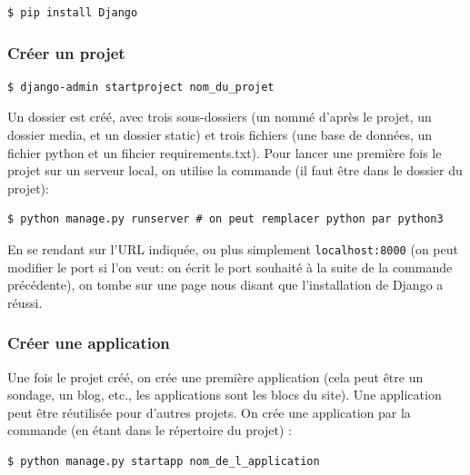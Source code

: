 \documentclass[a4paper, 10pt]{article}
\begin{document}
\begin{verbatim}
$ pip install Django
\end{verbatim}

\subsubsection{Créer un projet}
\begin{verbatim}
$ django-admin startproject nom_du_projet
\end{verbatim}

Un dossier est créé, avec trois sous-dossiers (un nommé d'après le projet, un dossier media, et un dossier static) et trois fichiers (une base de données, un fichier python et un fihcier requirements.txt). Pour lancer une première fois le projet sur un serveur local, on utilise la commande (il faut être dans le dossier du projet):
\begin{verbatim}
$ python manage.py runserver # on peut remplacer python par python3
\end{verbatim}
En se rendant sur l’URL indiquée, ou plus simplement \texttt{localhost:8000} (on peut modifier le port si l'on veut: on écrit le port souhaité à la suite de la commande précédente), on tombe sur une page nous disant que l'installation de Django a réussi.

\subsubsection{Créer une application}
Une fois le projet créé, on crée une première application (cela peut être un sondage, un blog, etc., les applications sont les blocs du site). Une application peut être réutilisée pour d'autres projets. On crée une application par la commande (en étant dans le répertoire du projet) :
\begin{verbatim}
$ python manage.py startapp nom_de_l_application
\end{verbatim}
\end{document}
